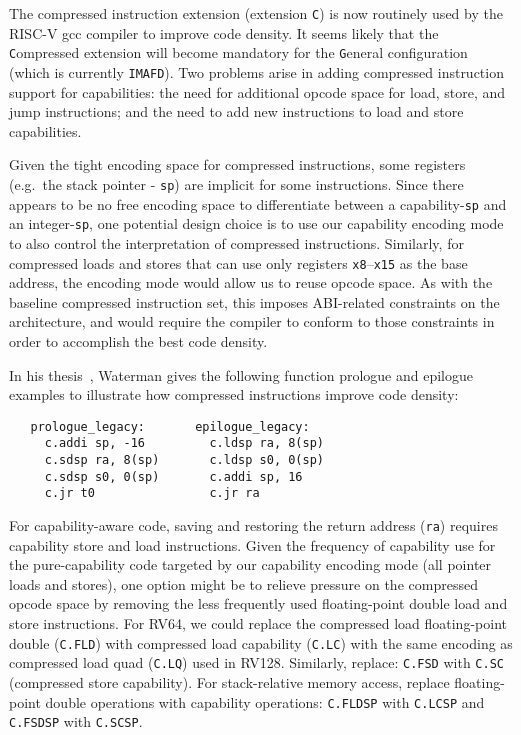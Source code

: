 The compressed instruction extension (extension \texttt{C}) is now
routinely used by the RISC-V gcc compiler to improve code density.  It seems
likely that the \texttt{C}ompressed extension will become mandatory for
the \texttt{G}eneral configuration (which is currently
\texttt{IMAFD}).
Two problems arise in adding compressed instruction support for capabilities:
the need for additional opcode space for load, store, and jump instructions;
and the need to add new instructions to load and store capabilities.

Given the tight encoding space for compressed instructions, some
registers (e.g.~the stack pointer - \texttt{sp}) are implicit for some
instructions.  Since there appears to be no free encoding space to
differentiate between a capability-\texttt{sp} and an
integer-\texttt{sp}, one potential design choice is to use our capability
encoding mode to also control the interpretation of compressed instructions.
Similarly, for compressed loads and
stores that can use only registers \texttt{x8}--\texttt{x15} as the
base address, the encoding mode would allow us to reuse opcode space.
As with the baseline compressed instruction set, this imposes ABI-related
constraints on the architecture, and would require the compiler to conform to
those constraints in order to accomplish the best code density.

In his thesis~\cite{WatermanThesis2016}, Waterman gives the following
function prologue and epilogue examples to illustrate how compressed
instructions improve code density:

\begin{small}
\begin{verbatim}
   prologue_legacy:       epilogue_legacy:
     c.addi sp, -16         c.ldsp ra, 8(sp)
     c.sdsp ra, 8(sp)       c.ldsp s0, 0(sp)
     c.sdsp s0, 0(sp)       c.addi sp, 16
     c.jr t0                c.jr ra
\end{verbatim}
\end{small}

For capability-aware code, saving and restoring the return address
(\texttt{ra}) requires capability store and load instructions.
Given the frequency of capability use for the pure-capability code targeted by
our capability encoding mode (all pointer loads and stores), one option might
be to relieve pressure on the compressed opcode space by removing the less
frequently used floating-point double load and store instructions.
For RV64, we could replace the compressed load floating-point double
(\texttt{C.FLD}) with compressed load capability (\texttt{C.LC}) with
the same encoding as compressed load quad (\texttt{C.LQ}) used in
RV128.  Similarly, replace: \texttt{C.FSD} with \texttt{C.SC}
(compressed store capability). For stack-relative memory access,
replace floating-point double operations with capability operations:
\texttt{C.FLDSP} with \texttt{C.LCSP} and \texttt{C.FSDSP} with
\texttt{C.SCSP}.

